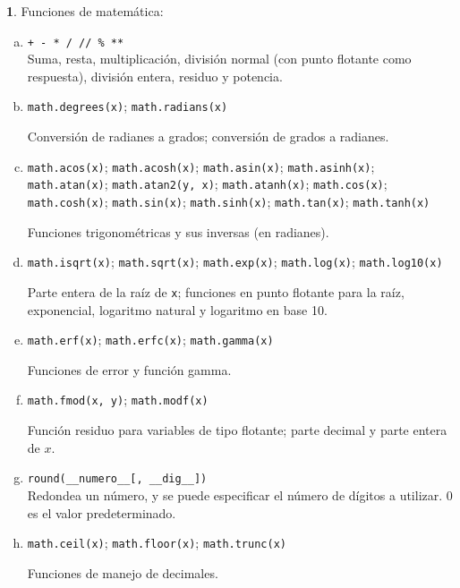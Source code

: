 \documentclass[12pt]{article}
\theoremstyle{definition}
\newtheorem{funcion}{}[section]
\begin{document}
\begin{funcion}
  Funciones de matemática:
  \begin{enumerate}[a)]
    \item \verb|+ - * / // % **| \\[1ex]
  Suma, resta, multiplicación, división normal (con punto flotante como respuesta), división entera, residuo y potencia.

    \item \verb|math.degrees(x)|; \verb|math.radians(x)|

      Conversión de radianes a grados; conversión de grados a radianes.

\item \verb|math.acos(x)|;
      \verb|math.acosh(x)|;
      \verb|math.asin(x)|;
      \verb|math.asinh(x)|;
      \verb|math.atan(x)|;
      \verb|math.atan2(y, x)|;
      \verb|math.atanh(x)|;
      \verb|math.cos(x)|;
      \verb|math.cosh(x)|;
      \verb|math.sin(x)|;
      \verb|math.sinh(x)|;
      \verb|math.tan(x)|;
      \verb|math.tanh(x)|

      Funciones trigonométricas y sus inversas (en radianes).

\item \verb|math.isqrt(x)|; \verb|math.sqrt(x)|; \verb|math.exp(x)|; \verb|math.log(x)|; \verb|math.log10(x)|

  Parte entera de la raíz de \verb|x|; funciones en punto flotante para la raíz, exponencial, logaritmo natural y logaritmo en base 10.

    \item \verb|math.erf(x)|; \verb|math.erfc(x)|; \verb|math.gamma(x)|

      Funciones de error y función gamma.

    \item \verb|math.fmod(x, y)|; \verb|math.modf(x)|
      
      Función residuo para variables de tipo flotante; parte decimal y parte entera de $x$.

\item \verb|round(__numero__[, __dig__])| \\[1ex]
  Redondea un número, y se puede especificar el número de dígitos a utilizar. 0 es el valor predeterminado.

    \item \verb|math.ceil(x)|;
      \verb|math.floor(x)|;
      \verb|math.trunc(x)|

      Funciones de manejo de decimales.


\end{enumerate}
\end{funcion}
\end{document}
